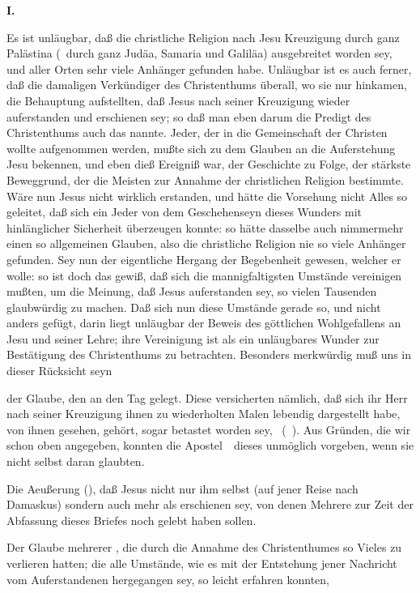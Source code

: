 \vabst \textbf{I.}~\par
Es ist unläugbar, daß die christliche Religion nach Jesu Kreuzigung durch ganz Palästina (\dh\ durch ganz Judäa, Samaria und Galiläa) ausgebreitet worden sey, und aller Orten sehr viele Anhänger gefunden habe. Unläugbar ist es auch ferner, daß die damaligen Verkündiger des Christenthums überall, wo sie nur hinkamen, die Behauptung aufstellten, daß Jesus nach seiner Kreuzigung wieder auferstanden und erschienen sey; so daß man eben darum die Predigt des Christenthums auch das  nannte. Jeder, der in die Gemeinschaft der Christen wollte aufgenommen werden, mußte sich zu dem Glauben an die Auferstehung Jesu bekennen, und eben dieß Ereigniß war, der Geschichte zu Folge, der stärkste Beweggrund, der die Meisten zur Annahme der christlichen Religion bestimmte. Wäre nun Jesus nicht wirklich erstanden, und hätte die Vorsehung nicht Alles so geleitet, daß sich ein Jeder von dem Geschehenseyn dieses Wunders mit hinlänglicher Sicherheit überzeugen konnte: so hätte dasselbe auch nimmermehr einen so allgemeinen Glauben, also die christliche Religion nie so viele Anhänger gefunden. Sey nun der eigentliche Hergang der Begebenheit gewesen, welcher er wolle: so ist doch das gewiß, daß sich die mannigfaltigsten Umstände vereinigen mußten, um die Meinung, daß Jesus auferstanden sey, so vielen Tausenden glaubwürdig zu machen. Daß sich nun diese Umstände gerade so, und nicht anders gefügt, darin liegt unläugbar der Beweis des göttlichen Wohlgefallens an Jesu und seiner Lehre; ihre Vereinigung ist als ein unläugbares Wunder zur Bestätigung des Christenthums zu betrachten. Besonders merkwürdig muß uns in dieser Rücksicht seyn
\begin{aufza}
\item der Glaube, den  an den Tag gelegt. Diese versicherten nämlich, daß sich ihr Herr nach seiner Kreuzigung ihnen zu wiederholten Malen lebendig dargestellt habe, von ihnen gesehen, gehört, sogar betastet worden sey, \udgl\  (\ ). Aus Gründen, die wir schon oben angegeben, konnten die Apostel~\ dieses unmöglich vorgeben, wenn sie nicht selbst daran glaubten.
\item Die Aeußerung  (), daß Jesus nicht nur ihm selbst (auf jener Reise nach Damaskus) sondern auch mehr als  erschienen sey, von denen Mehrere zur Zeit der Abfassung dieses Briefes noch gelebt haben sollen.
\item Der Glaube mehrerer , die durch die Annahme des Christenthumes so Vieles zu verlieren hatten; die alle Umstände, wie es mit der Entstehung jener Nachricht vom Auferstandenen hergegangen sey, so leicht erfahren konnten, \usw\
\end{aufza}\par

